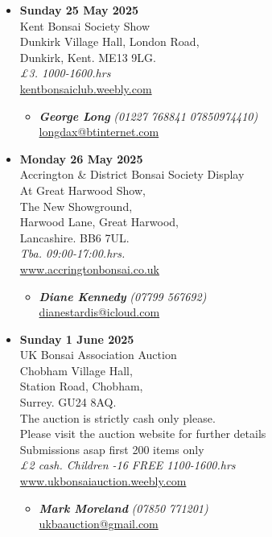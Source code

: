 \begin{itemize}
    \item \textbf{Sunday 25 May 2025}
    \\
    Kent Bonsai Society Show \\
    Dunkirk Village Hall, London Road, \\
    Dunkirk, Kent. ME13 9LG.
    \\
    \emph{£3. 1000-1600.hrs}
    \\
    \href{http://kentbonsaiclub.weebly.com/}{kentbonsaiclub.weebly.com}
    \begin{itemize}
        \item \textbf{\emph{George Long}} \emph{(01227 768841 07850974410)} \\
        \href{mailto:longdax@btinternet.com}{longdax@btinternet.com} 
    \end{itemize}

    \item \textbf{Monday 26 May 2025}
    \\
    Accrington \& District Bonsai Society Display \\
    At Great Harwood Show, \\
    The New Showground, \\
    Harwood Lane, Great Harwood, \\
    Lancashire. BB6 7UL.
    \\
    \emph{Tba. 09:00-17:00.hrs.}
    \\
    \href{https://www.accringtonbonsai.co.uk}{www.accringtonbonsai.co.uk}
    \begin{itemize}
        \item \textbf{\emph{Diane Kennedy}} \emph{(07799 567692)} \\
        \href{mailto:dianestardis@icloud.com}{dianestardis@icloud.com} 
    \end{itemize}

    \item \textbf{Sunday 1 June 2025}
    \\
    UK Bonsai Association Auction \\
    Chobham Village Hall, \\
    Station Road, Chobham, \\
    Surrey. GU24 8AQ. \\
    The auction is strictly cash only please. \\
    Please visit the auction website for further details \\
    Submissions asap first 200 items only
    \\
    \emph{£2 cash. Children -16 FREE 1100-1600.hrs}
    \\
    \href{https://www.ukbonsaiauction.weebly.com}{www.ukbonsaiauction.weebly.com}
    \begin{itemize}
        \item \textbf{\emph{Mark Moreland}} \emph{(07850 771201)} \\
        \href{mailto:ukbaauction@gmail.com}{ukbaauction@gmail.com} 
    \end{itemize}


\end{itemize}
